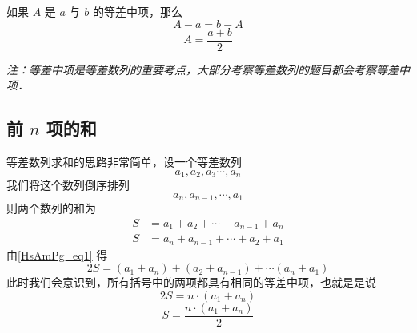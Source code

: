 如果 $A$ 是 $a$ 与 $b$ 的等差中项，那么
\begin{equation}
A - a = b - A
\end{equation}
\begin{equation}
A = \frac{a+b}{2}
\end{equation}

\textsl{注：等差中项是等差数列的重要考点，大部分考察等差数列的题目都会考察等差中项．}

\subsection{前 $n$ 项的和}
等差数列求和的思路非常简单，设一个等差数列
\begin{equation}
a_1,a_2,a_3\cdots,a_n
\end{equation}
我们将这个数列倒序排列
\begin{equation}
a_n,a_{n-1},\cdots,a_1
\end{equation}
则两个数列的和为
\begin{equation}\label{HsAmPg_eq1}
\begin{aligned}
S &= a_1 + a_2 + \cdots + a_{n-1} + a_n \\
S &= a_n + a_{n - 1} + \cdots + a_2 + a_1
\end{aligned}
\end{equation}
由\autoref{HsAmPg_eq1} 得
\begin{equation}
2S = (a_1+a_n) + (a_2+a_{n-1}) +\cdots (a_n + a_1)
\end{equation}
此时我们会意识到，所有括号中的两项都具有相同的等差中项，也就是是说
\begin{equation}
2S = n \cdot (a_1+a_n)
\end{equation}
\begin{equation}
S = \frac{n\cdot(a_1+a_n)}{2}
\end{equation}